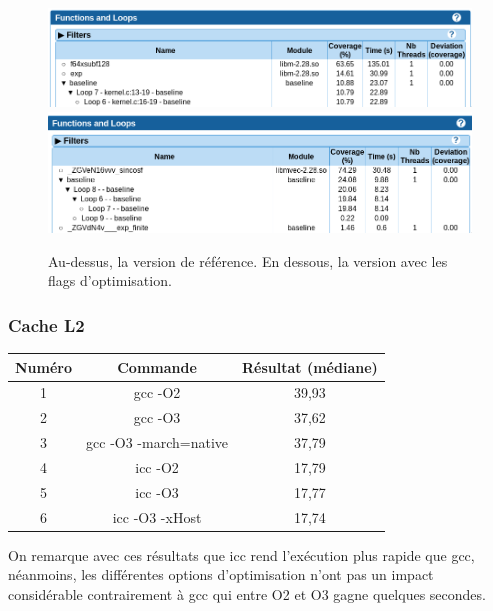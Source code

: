 \documentclass[12pt,a4paper]{article}
\begin{document}
\begin{figure}[ht]
    \centering
    \includegraphics[scale=0.5]{./figures/L1/maqao_noopt_ref_func.png}
    \includegraphics[scale=0.5]{./figures/L1/maqao_noopt_opt_func.png}
    \caption{Au-dessus, la version de référence. En dessous, la version avec les
    flags d'optimisation.}
    \label{fig.maqao_noopt_func}
\end{figure}

\subsubsection{Cache L2}

\begin{table}[ht]
    \centering
    \begin{tabular}{|c|c|c|}
        \hline
        Numéro & Commande & Résultat (médiane)\\
        \hline
        1 & gcc -O2 & 39,93 \\
        \hline
        2 & gcc -O3 & 37,62 \\
        \hline
        3 & gcc -O3 -march=native & 37,79 \\
        \hline
        4 & icc -O2 & 17,79 \\
        \hline
        5 & icc -O3 & 17,77 \\
        \hline
        6 & icc -O3 -xHost & 17,74 \\
        \hline
    \end{tabular}
\end{table}

On remarque avec ces résultats que icc rend l'exécution plus rapide que 
gcc, néanmoins, les différentes options d'optimisation n’ont pas un impact
considérable contrairement à gcc qui entre O2 et O3 gagne quelques secondes.
\end{document}
